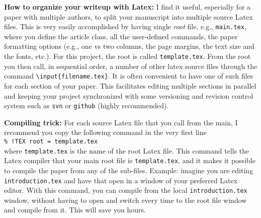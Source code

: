 \begin{remark}
\textbf{How to organize your writeup with Latex:} I find it useful, especially for a paper with multiple authors, to split your manuscript into multiple source Latex files. This is very easily accomplished by having single {\it root} file, e.g., \texttt{main.tex}, where you define the article class, all the \mbox{user-defined} commands, the paper formatting options (e.g., one vs two columns, the page margins, the text size and the fonts, etc.). For this project, the root is called \texttt{template.tex}. From the root you then call, in sequential order, a number of other latex source files through the command \texttt{\textbackslash input\{filename.tex\}}. It is often convenient to have one of such files for each section of your paper. This facilitates editing multiple sections in parallel and keeping your project synchronized with some versioning and revision control system such as \texttt{svn} or \texttt{github} (highly recommended).
\end{remark}

\begin{remark}
\textbf{Compiling trick:} For each source Latex file that you call from the main, I recommend you copy the following command in the very first line\\
\texttt{\% !TEX root = template.tex}\\
where \texttt{template.tex} is the name of the root Latex file. This command tells the Latex compiler that your main root file is \texttt{template.tex}, and it makes it possible to compile the paper from any of the sub-files. Example: imagine you are editing \texttt{introduction.tex} and have that open in a window of your preferred Latex editor. With this command, you can compile from the local \texttt{introduction.tex} window, without having to open and switch every time to the root file window and compile from it. This will save you hours.  
\end{remark}

\\


